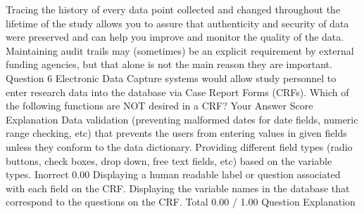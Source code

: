 Tracing the history of every data point collected and changed throughout the lifetime of the study allows you to assure that authenticity and security of data were preserved and can help you improve and monitor the quality of the data. Maintaining audit trails may (sometimes) be an explicit requirement by external funding agencies, but that alone is not the main reason they are important.
Question 6
Electronic Data Capture systems would allow study personnel to enter research data into the database via Case Report Forms (CRFs). Which of the following functions are NOT desired in a CRF?
Your Answer		Score	Explanation
Data validation (preventing malformed dates for date fields, numeric range checking, etc) that prevents the users from entering values in given fields unless they conform to the data dictionary.			
Providing different field types (radio buttons, check boxes, drop down, free text fields, etc) based on the variable types.	Inorrect	0.00	
Displaying a human readable label or question associated with each field on the CRF.			
Displaying the variable names in the database that correspond to the questions on the CRF.			
Total		0.00 / 1.00	
Question Explanation

